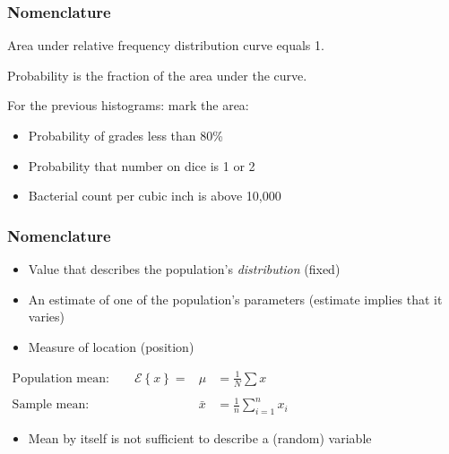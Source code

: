 \begin{frame}\frametitle{Nomenclature}
	{}

	Area under relative frequency distribution curve equals 1.

	Probability is the fraction of the area under the curve.

	For the previous histograms: mark the area:
	\begin{itemize}
		\item	Probability of grades less than 80\%
		\item	Probability that number on dice is 1 or 2
		\item	Bacterial count per cubic inch is above 10,000
	\end{itemize}
\end{frame}

\begin{frame}\frametitle{Nomenclature}
	{}
	\begin{itemize}
		\item	Value that describes the population's \emph{distribution} (fixed)
	\end{itemize}

	{}
	\begin{itemize}
		\item	An estimate of one of the population's parameters (estimate implies that it varies)
	\end{itemize}

	{}
	\begin{itemize}
		\item	Measure of location (position)
	\end{itemize}

	$
	\begin{array}{rcl}
		\text{Population mean:} \qquad \mathcal{E}\left\{x \right\} = &\mu &= \displaystyle \frac{1}{N}\sum{x} \\
		\\
		\text{Sample mean:} \qquad &\bar{x} &= \displaystyle \frac{1}{n}\sum_{i=1}^{n}{x_i}
	\end{array}
	$
	\begin{itemize}
		\item	Mean by itself is not sufficient to describe a (random) variable
	\end{itemize}
\end{frame}

